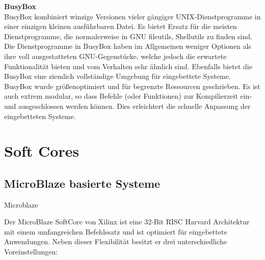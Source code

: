 \textbf{BusyBox}\\

BusyBox kombiniert winzige Versionen vieler gängiger UNIX-Dienstprogramme in einer einzigen kleinen ausführbaren Datei.
Es bietet Ersatz für die meisten Dienstprogramme, die normalerweise in GNU fileutils, Shellutils zu finden sind.
Die Dienstprogramme in BusyBox haben im Allgemeinen weniger Optionen als ihre voll ausgestatteten GNU-Gegenstücke, welche jedoch die erwartete Funktionalität bieten und vom Verhalten sehr ähnlich sind.
Ebenfalls bietet die BusyBox eine ziemlich vollständige Umgebung für eingebettete Systeme.\\
BusyBox wurde größenoptimiert und für begrenzte Ressourcen geschrieben.
Es ist auch extrem modular, so dass Befehle (oder Funktionen) zur Kompilierzeit ein- und ausgeschlossen werden können.
Dies erleichtert die schnelle Anpassung der eingebetteten Systeme.\cite{busybox}\\


\chapter{Soft Cores}\label{kap:softcores}
\section{MicroBlaze basierte Systeme}\label{kap:microblaze}
Microblaze

Der MicroBlaze SoftCore von Xilinx ist eine 32-Bit RISC Harvard Architektur mit einem umfangreichen Befehlssatz und ist optimiert für eingebettete Anwendungen.
Neben dieser Flexibilität besitzt er drei unterschiedliche Voreinstellungen:

